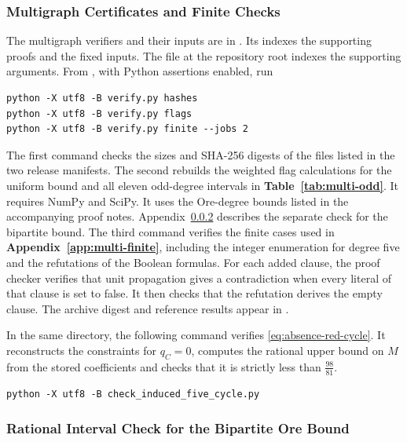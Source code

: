 \documentclass[preprint,11pt,numbers]{elsarticle-arxiv}
\numberwithin{equation}{section}
\theoremstyle{definition}
\begin{document}
\subsubsection{Multigraph Certificates and Finite Checks}
\label{app:multi-reproduction}

The multigraph verifiers and their inputs are in
.
Its  indexes the supporting proofs and the fixed
inputs. The file  at the repository root
indexes the supporting arguments. From ,
with Python assertions enabled, run
\begin{verbatim}
python -X utf8 -B verify.py hashes
python -X utf8 -B verify.py flags
python -X utf8 -B verify.py finite --jobs 2
\end{verbatim}
The first command checks the sizes and SHA-256 digests of the files
listed in the two release manifests. The second rebuilds
the weighted flag calculations for the uniform bound and all eleven
odd-degree intervals in \textbf{Table~\ref{tab:multi-odd}}.
It requires NumPy and SciPy.
It uses the Ore-degree bounds listed in the accompanying proof notes.
Appendix~\ref{app:ore-replay} describes the separate check for the
bipartite bound.
The third command verifies the finite cases used in
\textbf{Appendix~\ref{app:multi-finite}}, including the integer
enumeration for degree five and the refutations of the Boolean formulas.
For each added clause, the proof checker verifies that unit propagation
gives a contradiction when every literal of that clause is set to
false. It then checks that the refutation derives the empty clause.
The archive digest and reference results appear in .

In the same directory, the following command verifies
\eqref{eq:absence-red-cycle}. It reconstructs the constraints for
$q_C=0$, computes the rational upper bound on $M$ from the stored
coefficients and checks that it is strictly less than $\frac{98}{81}$.
\begin{verbatim}
python -X utf8 -B check_induced_five_cycle.py
\end{verbatim}

\subsubsection{Rational Interval Check for the Bipartite Ore Bound}
\label{app:ore-replay}
\end{document}
